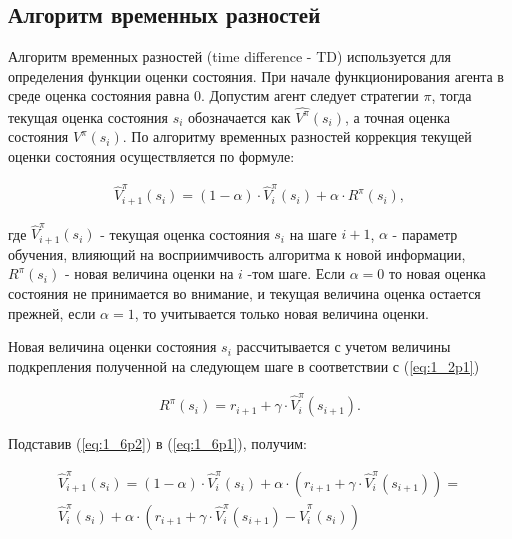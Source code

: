\subsection{Алгоритм временных разностей} \label{subsect1_6_1}

Алгоритм временных разностей (time difference - TD) используется для определения функции оценки состояния. При начале функционирования агента в среде оценка состояния равна 0. Допустим агент следует стратегии $ \pi $, тогда текущая оценка состояния $ s_i $ обозначается как $ \hat{V^{\pi}}(s_i) $, а точная оценка состояния $ V^{\pi}(s_i) $. По алгоритму временных разностей коррекция текущей оценки состояния осуществляется по формуле:

\begin{equation}
\label{eq:1_6p1}
\begin{alignedat}{2}
\hat{V}^{\pi}_{i+1}(s_i) = (1-\alpha)\cdot\hat{V}^{\pi}_{i}(s_i)+\alpha\cdot R^{\pi}(s_i),
\end{alignedat}
\end{equation}

\noindent где $ \hat{V}^{\pi}_{i+1}(s_i) $ - текущая оценка состояния $ s_i $ на шаге $ i+1 $, $ \alpha $ - параметр обучения, влияющий на восприимчивость алгоритма к новой информации, $ R^{\pi}(s_i) $ - новая величина оценки на $ i $ -том шаге. Если $ \alpha = 0 $ то новая оценка состояния не принимается во внимание, и текущая величина оценка остается прежней, если $ \alpha = 1 $, то учитывается только новая величина оценки.

Новая величина оценки состояния $ s_i $ рассчитывается с учетом величины подкрепления полученной на следующем шаге в соответствии с (\ref{eq:1_2p1})

\begin{equation}
\label{eq:1_6p2}
\begin{alignedat}{2}
R^{\pi}(s_i) = r_{i+1} + \gamma\cdot\hat{V}^{\pi}_{i}(s_{i+1}).
\end{alignedat}
\end{equation}

Подставив (\ref{eq:1_6p2}) в (\ref{eq:1_6p1}), получим:

\begin{equation}
\label{eq:1_6p3}
\begin{alignedat}{2}
\hat{V}^{\pi}_{i+1}(s_i) = (1-\alpha)\cdot\hat{V}^{\pi}_{i}(s_i)+\alpha\cdot ( r_{i+1} + \gamma\cdot\hat{V}^{\pi}_{i}(s_{i+1})) = \\ \hat{V}^{\pi}_{i}(s_i)+\alpha\cdot(r_{i+1}+ \gamma\cdot\hat{V}^{\pi}_{i}(s_{i+1})-\hat{V}^{\pi}_{i}(s_{i}))
\end{alignedat}
\end{equation}

